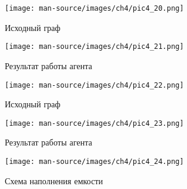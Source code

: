 \documentclass{thesisby}
\begin{document}
\begin{figure}[H]
    \centering
    \texttt{[image: man-source/images/ch4/pic4\_20.png]}
    \caption{Исходный граф}
    \label{fig:pic4_20}
\end{figure}


\begin{figure}[H]
    \centering
    \texttt{[image: man-source/images/ch4/pic4\_21.png]}
    \caption{Результат работы агента}
    \label{fig:pic4_21}
\end{figure}


\begin{figure}[H]
    \centering
    \texttt{[image: man-source/images/ch4/pic4\_22.png]}
    \caption{Исходный граф}
    \label{fig:pic4_22}
\end{figure}


\begin{figure}[H]
    \centering
    \texttt{[image: man-source/images/ch4/pic4\_23.png]}
    \caption{Результат работы агента}
    \label{fig:pic4_23}
\end{figure}


\begin{figure}[H]
    \centering
    \texttt{[image: man-source/images/ch4/pic4\_24.png]}
    \caption{Схема наполнения емкости}
    \label{fig:pic4_24}
\end{figure}
\end{document}
